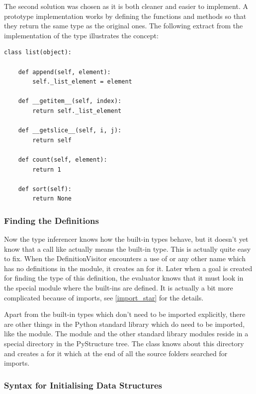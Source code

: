 \documentclass[12pt,halfparskip,DIV11,BCOR10mm]{scrreprt}
\begin{document}
The second solution was chosen as it is both cleaner and easier to implement. A prototype implementation works by defining the functions and methods so that they return the same type as the original ones. The following extract from the implementation of the  type illustrates the concept:

\begin{lstlisting}
class list(object):

    def append(self, element):
        self._list_element = element

    def __getitem__(self, index):
        return self._list_element

    def __getslice__(self, i, j):
        return self

    def count(self, element):
        return 1

    def sort(self):
        return None
\end{lstlisting}

\subsubsection{Finding the Definitions}

Now the type inferencer knows how the built-in types behave, but it doesn't yet know that a call like  actually means the built-in type. This is actually quite easy to fix. When the DefinitionVisitor encounters a use of  or any other name which has no definitions in the module, it creates an  for it. Later when a goal is created for finding the type of this definition, the evaluator knows that it must look in the special module  where the built-ins are defined. It is actually a bit more complicated because of  imports, see \vref{import_star} for the details.

Apart from the built-in types which don't need to be imported explicitly, there are other things in the Python standard library which do need to be imported, like the  module. The  module and the other standard library modules reside in a special directory in the PyStructure tree. The  class knows about this directory and creates a  for it which at the end of all the source folders searched for imports.

\subsubsection{Syntax for Initialising Data Structures}
\end{document}
